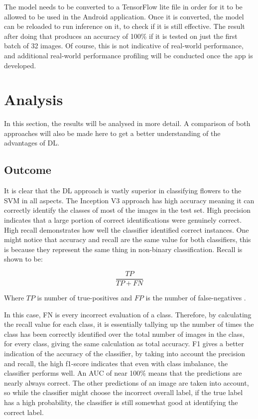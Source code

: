 \documentclass[12pt,a4paper]{report}
\begin{document}
The model needs to be converted to a TensorFlow lite file in order for it to be allowed to be used in the Android 
application. Once it is converted, the model can be reloaded to run inference on it, to check if it is still effective. The 
result after doing that produces an accuracy of 100\% if it is tested on just the first batch of 32 images. Of course, 
this is not indicative of real-world performance, and additional real-world performance profiling will be conducted
once the app is developed. 

\section{Analysis}

In this section, the results will be analysed in more detail. A comparison of both approaches will also be made here
to get a better understanding of the advantages of DL.

\subsection{Outcome}

It is clear that the DL approach is vastly superior in classifying flowers to the SVM in all aspects. The Inception V3
approach has high accuracy meaning it can correctly identify the classes of most of the images in the test set. 
High precision indicates that a large portion of correct identifications were genuinely correct. High recall demonstrates
how well the classifier identified correct instances. One might notice that accuracy and recall are the same value for 
both classifiers, this is because they represent the same thing in non-binary classification. Recall is shown to be:

\begin{equation}
    \frac{TP}{TP+FN}
\end{equation}

Where \(TP\) is number of true-positives and \(FP\) is the number of false-negatives \citep{googledevrecall}.

\par

In this case, FN is every incorrect evaluation of a class. Therefore, by calculating the recall value for each class,
it is essentially tallying up the number of times the class has been correctly identified over the total number of 
images in the class, for every class, giving the same calculation as total accuracy. F1 gives a better indication of 
the accuracy of 
the classifier, by taking into account the precision and recall, the high f1-score indicates that even with class 
imbalance, the classifier performs well. An AUC of near 100\% means that the predictions are nearly always 
correct. The other predictions of an image are taken into account, so while the classifier might choose the incorrect 
overall label, if the true label has a high probability, the classifier is still somewhat good at 
identifying the correct label.
\end{document}

